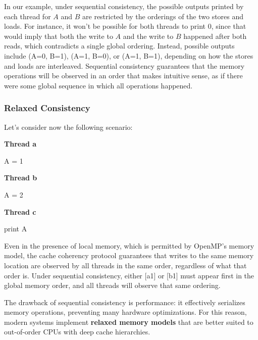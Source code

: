 In our example, under sequential consistency, the possible outputs printed by each thread for $A$ and $B$ are restricted by the orderings of the two stores and loads. For instance, it won't be possible for both threads to print 0, since that would imply that both the write to $A$ and the write to $B$ happened after both reads, which contradicts a single global ordering. Instead, possible outputs include (A=0, B=1), (A=1, B=0), or (A=1, B=1), depending on how the stores and loads are interleaved. Sequential consistency guarantees that the memory operations will be observed in an order that makes intuitive sense, as if there were some global sequence in which all operations happened.

\subsubsection{Relaxed Consistency}

Let's consider now the following scenario:

\begin{minipage}{0.32\textwidth}
    \centering
    \textbf{Thread a}
    \begin{codeblock}[language = C, numbers=none]
    [a1] A = 1
    \end{codeblock}
\end{minipage}%
\hfill
\begin{minipage}{0.32\textwidth}
    \centering
    \textbf{Thread b}
    \begin{codeblock}[language = C, numbers=none]
    [b1] A = 2
    \end{codeblock}
\end{minipage}%
\hfill
\begin{minipage}{0.32\textwidth}
    \centering
    \textbf{Thread c}
    \begin{codeblock}[language = C, numbers=none]
    [c1] print A
    \end{codeblock}
\end{minipage}%

Even in the presence of local memory, which is permitted by OpenMP's memory model, the cache coherency protocol guarantees that writes to the same memory location are observed by all threads in the same order, regardless of what that order is.
Under sequential consistency, either [a1] or [b1] must appear first in the global memory order, and all threads will observe that same ordering. 

The drawback of sequential consistency is performance: it effectively serializes memory operations, preventing many hardware optimizations. For this reason, modern systems implement \textbf{relaxed memory models} that are better suited to out-of-order CPUs with deep cache hierarchies.

